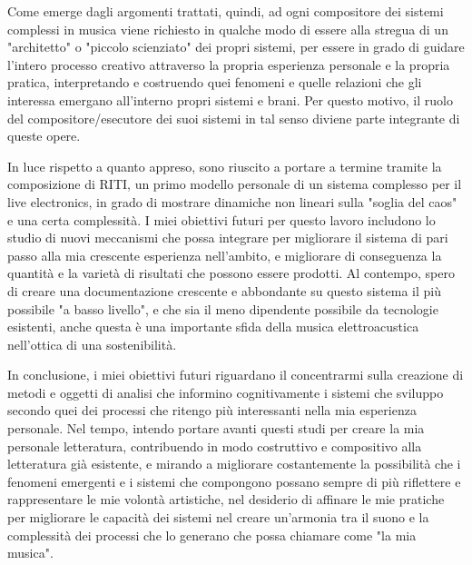 Come emerge dagli argomenti trattati, quindi, ad ogni compositore dei sistemi complessi in musica 
viene richiesto in qualche modo di essere alla stregua di un "architetto" o "piccolo scienziato" dei propri sistemi,
per essere in grado di guidare l'intero processo creativo 
attraverso la propria esperienza personale e la propria pratica, 
interpretando e costruendo quei fenomeni e quelle relazioni che gli interessa emergano 
all'interno propri sistemi e brani.
Per questo motivo, il ruolo del compositore/esecutore dei suoi sistemi 
in tal senso diviene parte integrante di queste opere.

In luce rispetto a quanto appreso, 
sono riuscito a portare a termine tramite la composizione di RITI, un primo modello personale 
di un sistema complesso per il live electronics,
in grado di mostrare dinamiche non lineari sulla "soglia del caos" e una certa complessità.
I miei obiettivi futuri per questo lavoro includono lo studio di nuovi 
meccanismi che possa integrare per migliorare il sistema di pari passo alla mia crescente esperienza nell'ambito,
e migliorare di conseguenza la quantità e la varietà di risultati che possono essere prodotti.
Al contempo, spero di creare una documentazione crescente e abbondante su questo sistema 
il più possibile "a basso livello", e che sia il meno dipendente possibile da tecnologie esistenti,
anche questa è una importante sfida della musica elettroacustica nell'ottica 
di una sostenibilità.

In conclusione, i miei obiettivi futuri riguardano il concentrarmi 
sulla creazione di metodi e oggetti di analisi che informino cognitivamente 
i sistemi che sviluppo secondo quei dei processi che ritengo più interessanti nella mia esperienza personale. 
Nel tempo, intendo portare avanti questi studi per creare la mia personale letteratura, 
contribuendo in modo costruttivo e compositivo alla letteratura già esistente,
e mirando a migliorare costantemente la possibilità 
che i fenomeni emergenti e i sistemi che compongono
possano sempre di più riflettere e rappresentare le mie volontà artistiche, 
nel desiderio di affinare le mie pratiche per migliorare le capacità 
dei sistemi nel creare un'armonia tra il suono e la complessità dei processi che lo generano 
che possa chiamare come "la mia musica".